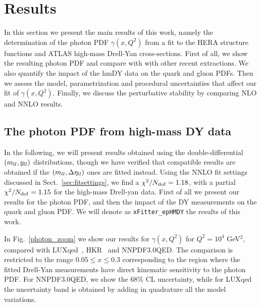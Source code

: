 \section{Results}
\label{sec:results}

In this section we present the main results of this work,
namely the determination
of the photon PDF $\gamma(x,Q^2)$ from a fit to the HERA structure functions
and ATLAS high-mass Drell-Yan cross-sections.
%
First of all, we show the resulting photon PDF and compare with
with other recent extractions.
%
We also quantify the impact of the hmDY data on the quark and
gluon PDFs.
%
Then we assess the model, parametrization
and procedural uncertainties that affect our fit of $\gamma(x,Q^2)$.
%
Finally, we discuss the perturbative stability by comparing
NLO and NNLO results.

\subsection{The photon PDF from high-mass DY data}

In the following, we will present results obtained using the
double-differential $\left( m_{ll},y_{ll}\right)$ distributions, though
we have verified that compatible results
are obtained if the $\left( m_{ll},\Delta\eta_{ll}\right)$ ones are fitted
instead.
%
Using the NNLO fit settings discussed in Sect.~\ref{sec:fitsettings}, we find
a $\chi^{2}/N_{\rm dof} = 1.18$,
with a partial $\chi^2/N_{\rm dof} = 1.15$ for the high-mass Drell-yan data.
%
First of all we present our results for the photon PDF, and then the impact
of the DY measurements on the quark and gluon PDF.
%
We will denote as {\tt xFitter\_epHMDY} the results of this work.

In Fig.~\ref{photon_zoom} we show our results
for $\gamma(x,Q^2)$ for $Q^2=10^4$ GeV$^2$,
compared with LUXqed~\cite{Manohar:2016nzj}, HKR~\cite{Harland-Lang:2016apc}
and NNPDF3.0QED.
%
The comparison is restricted to the range $0.05 \le x \le 0.3$ corresponding
to the region where the fitted Drell-Yan measurements have direct kinematic sensitivity
to the photon PDF.
%
For NNPDF3.0QED, we show the 68\% CL uncertainty, while for LUXqed the uncertainty band
is obtained by adding in quadrature all the model variations.

